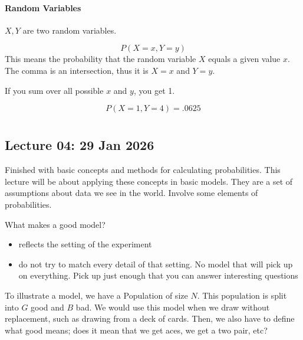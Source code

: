 \documentclass{report}
\begin{document}
\subsubsection{Random Variables}
$X, Y$ are two random variables. 

\[P(X=x, Y=y)\]
This means the probability that the random variable $X$ equals a given value $x$. The comma is an intersection, thus it is $X = x$ and $Y = y$. 

If you sum over all possible $x$ and $y$, you get 1. 

\[P(X=1, Y=4) = .0625\]

\chapter{}
\section{Lecture 04: 29 Jan 2026}

Finished with basic concepts and methods for calculating probabilities. This lecture will be about applying these concepts in basic models. 
They are a set of assumptions about data we see in the world. Involve some elements of probabilities.

\noindent
What makes a good model?
\begin{itemize}
	\item reflects the setting of the experiment
	\item do not try to match every detail of that setting. No model that will pick up on everything. Pick up just enough that you can answer interesting questions
\end{itemize}
To illustrate a model, we have a Population of size $N$. This population is split into $G$ good and $B$ bad. 
\newline \smallskip
{}
We would use this model when we draw without replacement, such as drawing from a deck of cards. Then, we also have to define what good means; does it mean that we get aces, we get a two pair, etc? 
\end{document}
